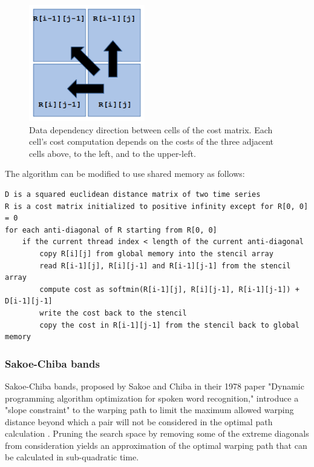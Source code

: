 \documentclass[12pt, letterpaper]{article}
\begin{document}
\begin{figure}[htbp]
\includegraphics[height=2in]{img/cost_dependencies.png}
\centering
\caption{Data dependency direction between cells of the cost matrix.
Each cell's cost computation depends on the costs of the three adjacent cells
above, to the left, and to the upper-left.}
\label{cost_deps}
\end{figure}

\FloatBarrier
The algorithm can be modified to use shared memory as follows:

\begin{verbatim}
D is a squared euclidean distance matrix of two time series
R is a cost matrix initialized to positive infinity except for R[0, 0] = 0
for each anti-diagonal of R starting from R[0, 0]
    if the current thread index < length of the current anti-diagonal
        copy R[i][j] from global memory into the stencil array
        read R[i-1][j], R[i][j-1] and R[i-1][j-1] from the stencil array
        compute cost as softmin(R[i-1][j], R[i][j-1], R[i-1][j-1]) + D[i-1][j-1]
        write the cost back to the stencil
        copy the cost in R[i-1][j-1] from the stencil back to global memory
\end{verbatim}
\FloatBarrier

\subsubsection{Sakoe-Chiba bands}

Sakoe-Chiba bands, proposed by Sakoe and Chiba in their 1978 paper "Dynamic
programming algorithm optimization for spoken word recognition," introduce a
"slope constraint" to the warping path to limit the maximum allowed warping
distance beyond which a pair will not be considered in the optimal path
calculation \cite{sakoe_dynamic_1978}. Pruning the search space by removing some
of the extreme diagonals from consideration yields an approximation of the
optimal warping path that can be calculated in sub-quadratic time.
\end{document}
